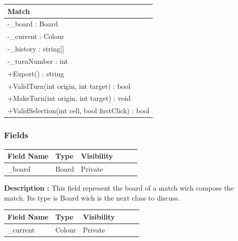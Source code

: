 \documentclass[12pt]{article}
\begin{document}
\begin{table}[H]
    \begin{tabular}{|l|}
    \hline
    \rowcolor[HTML]{C0C0C0} 
    \textbf{Match}                                    \\ \hline
    \rowcolor[HTML]{EFEFEF} 
    -\_board : Board                                  \\ \hline
    \rowcolor[HTML]{EFEFEF} 
    -\_current : Colour                               \\ \hline
    \rowcolor[HTML]{EFEFEF} 
    -\_history : string{[}{]}                         \\ \hline
    \rowcolor[HTML]{EFEFEF} 
    -\_turnNumber : int                               \\ \hline
    +Export() : string                                \\ \hline
    +ValidTurn(int origin, int target) : bool         \\ \hline
    +MakeTurn(int origin, int target) : void          \\ \hline
    +ValidSelection(int cell, bool firstClick) : bool \\ \hline
    \end{tabular}
\end{table}

\subsubsection{Fields}

\begin{table}[H]
    \begin{tabular}{llllll}
    \hline
    \multicolumn{1}{|l|}{\cellcolor[HTML]{EFEFEF}\textbf{Field Name}} & \multicolumn{1}{l|}{\cellcolor[HTML]{EFEFEF}\textbf{Type}} & \multicolumn{1}{l|}{\cellcolor[HTML]{EFEFEF}\textbf{Visibility}} \\ \hline
    \multicolumn{1}{|l|}{\_board}                                     & \multicolumn{1}{l|}{Board}                                 & \multicolumn{1}{l|}{Private}                                     \\ \hline
    \end{tabular}
\end{table}

\textbf{Description :} This field represent the board of a match wich compose
the match. Its type is Board wich is the next class to discuss.

\begin{table}[H]
    \begin{tabular}{llllll}
    \hline
    \multicolumn{1}{|l|}{\cellcolor[HTML]{EFEFEF}\textbf{Field Name}} & \multicolumn{1}{l|}{\cellcolor[HTML]{EFEFEF}\textbf{Type}} & \multicolumn{1}{l|}{\cellcolor[HTML]{EFEFEF}\textbf{Visibility}} \\ \hline
    \multicolumn{1}{|l|}{\_current}                                     & \multicolumn{1}{l|}{Colour}                                 & \multicolumn{1}{l|}{Private}                                     \\ \hline
    \end{tabular}
\end{table}
\end{document}
